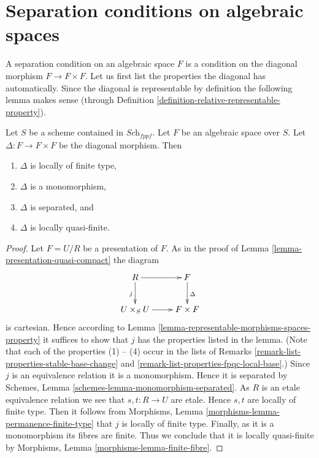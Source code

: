 \section{Separation conditions on algebraic spaces}
\label{section-separation}

\noindent
A separation condition on an algebraic space $F$ is a condition
on the diagonal morphism $F \to F \times F$. Let us first
list the properties the diagonal has automatically.
Since the diagonal is representable by definition the following lemma
makes sense (through
Definition \ref{definition-relative-representable-property}).

\begin{lemma}
\label{lemma-properties-diagonal}
Let $S$ be a scheme contained in $\textit{Sch}_{fppf}$.
Let $F$ be an algebraic space over $S$.
Let $\Delta : F \to F \times F$ be the diagonal morphism.
Then
\begin{enumerate}
\item $\Delta$ is locally of finite type,
\item $\Delta$ is a monomorphism,
\item $\Delta$ is separated, and
\item $\Delta$ is locally quasi-finite.
\end{enumerate}
\end{lemma}

\begin{proof}
Let $F = U/R$ be a presentation of $F$.
As in the proof of Lemma \ref{lemma-presentation-quasi-compact} the diagram
$$
\xymatrix{
R \ar[r] \ar[d]_j & F \ar[d]^\Delta \\
U \times_S U \ar[r] & F \times F
}
$$
is cartesian. Hence according to
Lemma \ref{lemma-representable-morphisms-spaces-property}
it suffices to show that $j$ has the properties listed in the lemma.
(Note that each of the properties (1) -- (4) occur in the lists
of Remarks \ref{remark-list-properties-stable-base-change}
and \ref{remark-list-properties-fpqc-local-base}.)
Since $j$ is an equivalence relation it is a monomorphism.
Hence it is separated by
Schemes, Lemma \ref{schemes-lemma-monomorphism-separated}.
As $R$ is an etale equivalence relation we see that
$s, t : R \to U$ are etale. Hence $s, t$ are locally of finite
type. Then it follows from
Morphisms, Lemma \ref{morphisms-lemma-permanence-finite-type} that
$j$ is locally of finite type. Finally, as it is a monomorphism
its fibres are finite. Thus we conclude that it is locally quasi-finite by
Morphisms, Lemma \ref{morphisms-lemma-finite-fibre}.
\end{proof}

